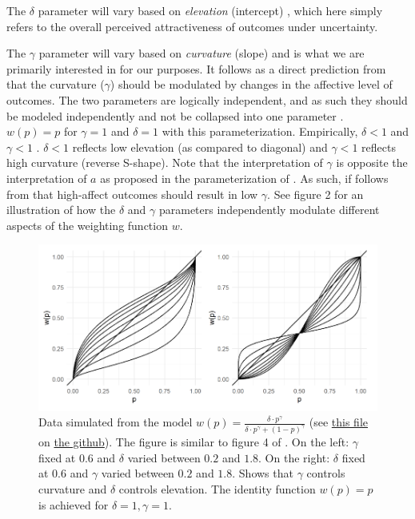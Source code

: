 \documentclass[12pt]{article}
\begin{document}
The $\delta$ parameter will vary based on
\emph{elevation} (intercept)
\autocite{gonzalez1999shape},
which here simply refers to the overall
perceived attractiveness of outcomes
under uncertainty.

\vspace{3mm}

The $\gamma$ parameter will vary based on
\emph{curvature} (slope)
\autocite{gonzalez1999shape} and is what we
are primarily interested in for our purposes.
It follows as a direct prediction from
\textcite{rottenstreich2001money} that the
curvature ($\gamma$) should be modulated by changes in
the affective level of outcomes.
The two parameters are logically independent,
and as such they should be modeled
independently and not be collapsed into one
parameter \autocite{abdellaoui2010separating,
gonzalez1999shape}. \\

$w(p) = p$ for  $\gamma = 1$ and $\delta = 1$
with this parameterization. Empirically,
$\delta < 1$ and $\gamma < 1$
\autocite{gonzalez1999shape}. $\delta < 1$
reflects low elevation (as compared to diagonal)
and  $\gamma < 1$ reflects high curvature
(reverse S-shape). Note that the interpretation
of $\gamma$ is opposite the interpretation of
$a$ as proposed in the parameterization of
\textcite{rottenstreich2001money}. As such,
if follows from \textcite{rottenstreich2001money}
that high-affect outcomes should result in low
$\gamma$.
See figure 2 for an
illustration of how the $\delta$
and $\gamma$ parameters independently modulate
different aspects of the weighting function $w$.

\begin{figure}[H]
	\includegraphics[width = \linewidth]{../Figures/Fig2.png}
	\caption{Data simulated from the model
		$w(p) = \frac{\delta \cdot p^{\gamma}}
	{\delta \cdot p^{\gamma} +
	(1-p)^{\gamma}}$ (see \href{
https://github.com/victor-m-p/BayesianDecisionWeights/blob/main/Code/0_visualize_parameters.Rmd}{this
file} on \href{https://github.com/victor-m-p/BayesianDecisionWeights}{the
github}). The figure
	is similar to figure 4
	of \textcite{gonzalez1999shape}.
	On the left: $\gamma$ fixed at $0.6$
	and $\delta$ varied between $0.2$ and $1.8$.
	On the right: $\delta$ fixed at $0.6$
	and $\gamma$ varied between $0.2$ and $1.8$.
	Shows that $\gamma$  controls
	curvature and $\delta$ controls
	elevation. The identity function $w(p) = p$
	is achieved for $\delta = 1, \gamma = 1$.}
\end{figure}
\end{document}
